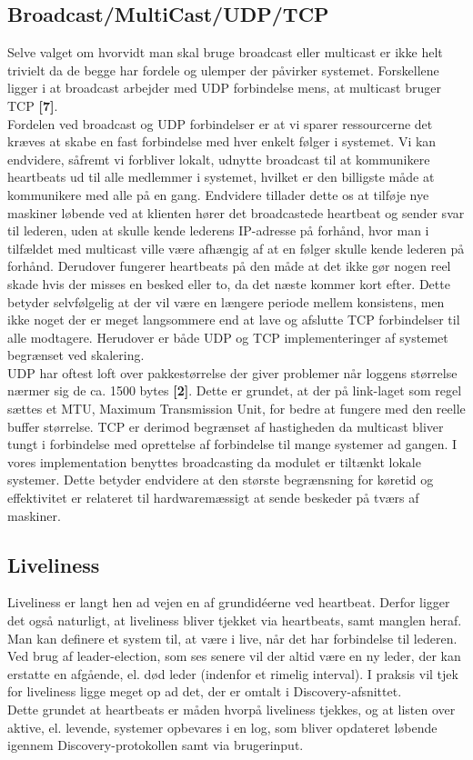\documentclass[a4paper,12pt]{article}
\begin{document}
\subsection{Broadcast/MultiCast/UDP/TCP}
Selve valget om hvorvidt man skal bruge broadcast eller multicast er ikke helt trivielt da de begge har fordele og ulemper der påvirker systemet. Forskellene ligger i at broadcast arbejder med UDP forbindelse mens, at multicast bruger TCP \textbf{[7]}.
\\
Fordelen ved broadcast og UDP forbindelser er at vi sparer ressourcerne det kræves at skabe en fast forbindelse med hver enkelt følger i systemet. Vi kan endvidere, såfremt vi forbliver lokalt, udnytte broadcast til at kommunikere heartbeats ud til alle medlemmer i systemet, hvilket er den billigste måde at kommunikere med alle på en gang. Endvidere tillader dette os at tilføje nye maskiner løbende ved at klienten hører det broadcastede heartbeat og sender svar til lederen, uden at skulle kende lederens IP-adresse på forhånd, hvor man i tilfældet med multicast ville være afhængig af at en følger skulle kende lederen på forhånd. Derudover fungerer heartbeats på den måde at det ikke gør nogen reel skade hvis der misses en besked eller to, da det næste kommer kort efter. Dette betyder selvfølgelig at der vil være en længere periode mellem konsistens, men ikke noget der er meget langsommere end at lave og afslutte TCP forbindelser til alle modtagere.
Herudover er både UDP og TCP implementeringer af systemet begrænset ved skalering.
\\[5px]
UDP har oftest loft over pakkestørrelse der giver problemer når loggens størrelse nærmer sig de ca. 1500 bytes \textbf{[2]}. Dette er grundet, at der på link-laget som regel sættes et MTU, Maximum Transmission Unit, for bedre at fungere med den reelle buffer størrelse. TCP er derimod begrænset af hastigheden da multicast bliver tungt i forbindelse med oprettelse af forbindelse til mange systemer ad gangen. 
I vores implementation benyttes broadcasting da modulet er tiltænkt lokale systemer.
Dette betyder endvidere at den største begrænsning for køretid og effektivitet er relateret til hardwaremæssigt at sende beskeder på tværs af maskiner.

\subsection{Liveliness} 
Liveliness er langt hen ad vejen en af grundidéerne ved heartbeat. Derfor ligger det også naturligt, at liveliness bliver tjekket via heartbeats, samt manglen heraf. Man kan definere et system til, at være i live, når det har forbindelse til lederen. Ved brug af leader-election, som ses senere vil der altid være en ny leder, der kan erstatte en afgående, el. død leder (indenfor et rimelig interval). I praksis vil tjek for liveliness ligge meget op ad det, der er omtalt i Discovery-afsnittet.
\\
Dette grundet at heartbeats er måden hvorpå liveliness tjekkes, og at listen over aktive, el. levende, systemer opbevares i en log, som bliver opdateret løbende igennem Discovery-protokollen samt via brugerinput.
\end{document}
